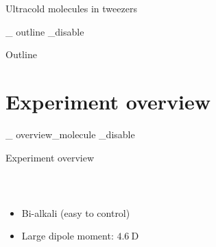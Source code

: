 \documentclass{beamer}
\newcommand\ifSlide[1]{
    \expandafter\ifcsname slide_ #1 _disable \endcsname
    \else
  }
\newcommand\ifSlide[1]{
    \expandafter\ifcsname slide_ #1 _enable \endcsname
  }
\begin{document}
\begin{frame}{Ultracold molecules in tweezers}
\begin{center}
  \end{center}
\end{frame}
\fi

\ifSlide{outline}
\begin{frame}{Outline}
  \tableofcontents
\end{frame}
\fi

\section{Experiment overview}
\ifSlide{overview_molecule}
\begin{frame}[t]{Experiment overview}
  \begin{columns}
    \column{5.8cm}
    \column{5.8cm}
    \begin{center}
      {}\\
      \begin{itemize}
      \item Bi-alkali (easy to control)
      \item Large dipole moment: $4.6\ \mathrm{D}$
      \end{itemize}
    \end{center}
  \end{columns}
\end{frame}
\fi
\end{document}
